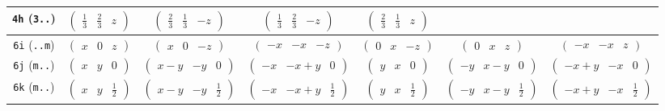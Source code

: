 \documentclass[fleqn,9pt,landscape]{jsarticle}
\begin{document}
\begin{center}
\begin{longtable}{ccccccc}
{\tt 4h} ({\tt 3..}) & $ \begin{pmatrix} \frac{1}{3} & \frac{2}{3} & z \end{pmatrix} $ & $ \begin{pmatrix} \frac{2}{3} & \frac{1}{3} & - z \end{pmatrix} $ & $ \begin{pmatrix} \frac{1}{3} & \frac{2}{3} & - z \end{pmatrix} $ & $ \begin{pmatrix} \frac{2}{3} & \frac{1}{3} & z \end{pmatrix} $ & $  $ & $  $ \\ \hline
{\tt 6i} ({\tt ..m}) & $ \begin{pmatrix} x & 0 & z \end{pmatrix} $ & $ \begin{pmatrix} x & 0 & - z \end{pmatrix} $ & $ \begin{pmatrix} - x & - x & - z \end{pmatrix} $ & $ \begin{pmatrix} 0 & x & - z \end{pmatrix} $ & $ \begin{pmatrix} 0 & x & z \end{pmatrix} $ & $ \begin{pmatrix} - x & - x & z \end{pmatrix} $ \\ \hline
{\tt 6j} ({\tt m..}) & $ \begin{pmatrix} x & y & 0 \end{pmatrix} $ & $ \begin{pmatrix} x - y & - y & 0 \end{pmatrix} $ & $ \begin{pmatrix} - x & - x + y & 0 \end{pmatrix} $ & $ \begin{pmatrix} y & x & 0 \end{pmatrix} $ & $ \begin{pmatrix} - y & x - y & 0 \end{pmatrix} $ & $ \begin{pmatrix} - x + y & - x & 0 \end{pmatrix} $ \\ \hline
{\tt 6k} ({\tt m..}) & $ \begin{pmatrix} x & y & \frac{1}{2} \end{pmatrix} $ & $ \begin{pmatrix} x - y & - y & \frac{1}{2} \end{pmatrix} $ & $ \begin{pmatrix} - x & - x + y & \frac{1}{2} \end{pmatrix} $ & $ \begin{pmatrix} y & x & \frac{1}{2} \end{pmatrix} $ & $ \begin{pmatrix} - y & x - y & \frac{1}{2} \end{pmatrix} $ & $ \begin{pmatrix} - x + y & - x & \frac{1}{2} \end{pmatrix} $ \\ \hline

\end{longtable}
\end{center}
\end{document}
